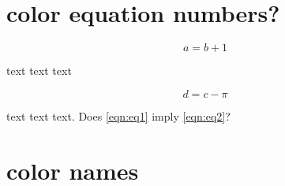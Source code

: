 \documentclass[openany]{memoir}
\newcommand{\HRule}[1]{\hfill \rule{0.2\linewidth}{#1}} %
\begin{document}
%
%
%		
%		
%
%
%
%
%
\section{color equation numbers?}

\begin{equation}\label{eqn:eq1}
a = b + 1
\end{equation}

text text text

\begin{equation}\label{eqn:eq2}
d = c - \pi
\end{equation}

text text text.  Does \ref{eqn:eq1} imply \ref{eqn:eq2}?

\section{color names}
\end{document}
